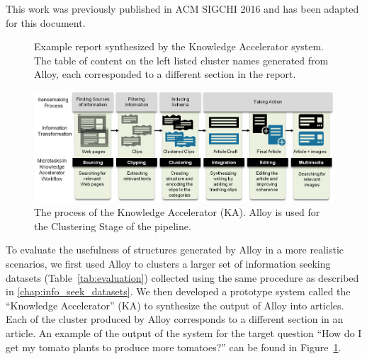 
{\rmfamily
This work was previously published in ACM SIGCHI 2016 \cite{ka} and has been adapted for this document.
}

\begin{figure}
    \centering
    \caption[Alloy clusters synthesized into a report articles using the Knowledge Accelerator.]{Example report synthesized by the Knowledge Accelerator system. The table of content on the left listed cluster names generated from Alloy, each corresponded to a different section in the report.}
    \label{fig:final_answer}
\end{figure}

\begin{figure}
    \centering
    \includegraphics[width=1\columnwidth]{Chapters/KA/overview}
    \caption[The Knowledge Accelerator (KA) with Alloy as the Clustering Stage.]{The process of the Knowledge Accelerator (KA). Alloy is used for the Clustering Stage of the pipeline.}
    \label{fig:process}
\end{figure}


To evaluate the usefulness of structures generated by Alloy in a more realistic scenarios, we first used Alloy to clusters a larger set of information seeking datasets (Table~\ref{tab:evaluation}) collected using the same procedure as described in \cref{chap:info_seek_datasets}. We then developed a prototype system called the ``Knowledge Accelerator'' (KA) to synthesize the output of Alloy into articles. Each of the cluster produced by Alloy corresponds to a different section in an article. An example of the output of the system for the target question ``How do I get my tomato plants to produce more tomatoes?'' can be found in Figure~\ref{fig:final_answer}.

